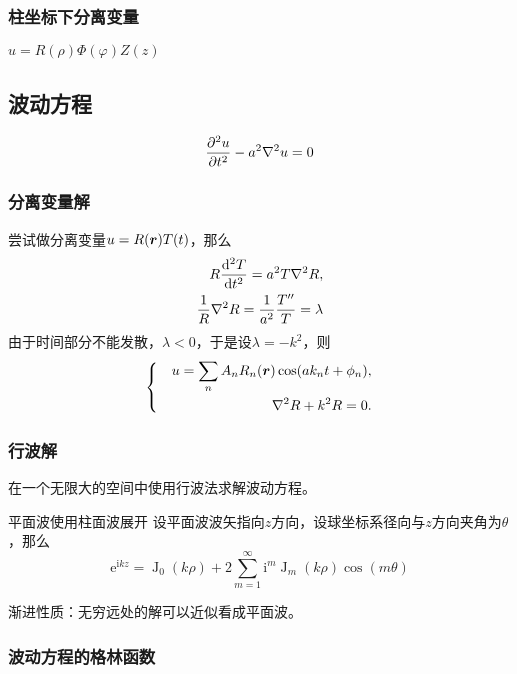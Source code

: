 \documentclass[UTF8]{ctexart}
\newenvironment{bigcase}{\left\{ \quad \begin{aligned}}{\end{aligned}\right.}
\newcommand*{\ii}{\mathrm{i}}
\newcommand*{\ee}{\mathrm{e}}
\DeclareMathOperator{\besselj}{J}
\begin{document}
\subsubsection{柱坐标下分离变量}

$u=R(\rho)\Phi(\varphi)Z(z)$



\subsection{波动方程}

\begin{equation}
    \pdv[2]{u}{t} - a^2 \laplacian u = 0
    \label{eq:wave-eq-no-source}
\end{equation}

\subsubsection{分离变量解}

尝试做分离变量$u = R(\vb*{r}) T(t)$，那么
\[
    \begin{split}
        R \dv[2]{T}{t} = a^2 T \laplacian R, \\
        \frac{1}{R} \laplacian R = \frac{1}{a^2} \frac{T''}{T} = \lambda
    \end{split}
\]
由于时间部分不能发散，$\lambda < 0$，于是设$\lambda = -k^2$，则
\begin{equation}
    \begin{bigcase}
        u = \sum_n A_n R_n(\vb*{r}) \cos (a k_n t + \phi_n), \\
        \laplacian R + k^2 R = 0.
    \end{bigcase}
\end{equation}

\subsubsection{行波解}

在一个无限大的空间中使用行波法求解波动方程。

平面波使用柱面波展开
设平面波波矢指向$z$方向，设球坐标系径向与$z$方向夹角为$\theta$，那么
\begin{equation}
    \ee^{\ii k z} = \besselj_0 (k \rho) + 2 \sum_{m=1}^\infty \ii^m \besselj_m(k \rho) \cos(m \theta)
\end{equation}

渐进性质：无穷远处的解可以近似看成平面波。

\subsubsection{波动方程的格林函数}
\end{document}
